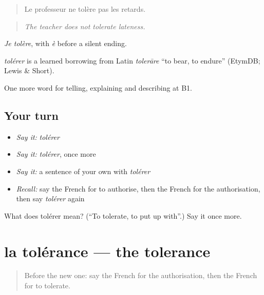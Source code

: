 \begin{quote}
Le professeur ne tolère pas les retards.
\end{quote}

\begin{quote}
\emph{The teacher does not tolerate lateness.}
\end{quote}

\emph{Je tolère}, with \emph{è} before a silent ending.

\begin{cousinweb}
\emph{tolérer} is a learned borrowing from Latin \emph{tolerāre} \textquotedblleft{}to bear, to endure\textquotedblright{} (EtymDB; Lewis \& Short).
\end{cousinweb}

\begin{grammarlens}[title={What you've built}]
One more word for telling, explaining and describing at B1.
\end{grammarlens}

\subsection*{Your turn}
\begin{itemize}
\raggedright
  \item \emph{Say it:} \emph{tolérer}
  \item \emph{Say it:} \emph{tolérer}, once more
  \item \emph{Say it:} a sentence of your own with \emph{tolérer}
  \item \emph{Recall:} say the French for to authorise, then the French for the authorisation, then say \emph{tolérer} again
\end{itemize}

\begin{tcolorbox}[breakable,colback=teal!4,colframe=teal!35!black,title={Before you move on}]
What does tolérer mean? (\textquotedblleft{}To tolerate, to put up with\textquotedblright{}.) Say it once more.
\end{tcolorbox}
\section[la tolérance]{la tolérance — the tolerance}

\label{lesson:FR-C381-tolerance}



\begin{quote}
Before the new one: say the French for the authorisation, then the French for to tolerate.
\end{quote}

